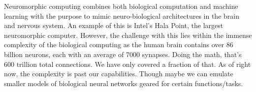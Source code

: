 \documentclass[letterpaper,11pt]{article}
\begin{document}
\begin{enumerate}[label=\alph*)]
\begin{tcolorbox}
Neuromorphic computing combines both biological computation and machine learning with the purpose to mimic neuro-biological architectures in the brain and nervous system. An example of this is Intel's Hala Point, the largest neuromorphic computer. However, the challenge with this lies within the immense complexity of the biological computing as the human brain contains over 86 billion neurons, each with an average of 7000 synapses. Doing the math, that's 600 trillion total connections. We have only covered a fraction of that. As of right now, the complexity is past our capabilities. Though maybe we can emulate smaller models of biological neural networks geared for certain functions/tasks.
\end{tcolorbox}

\end{enumerate}
\end{document}
